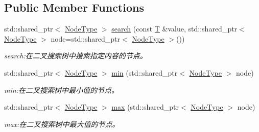\subsection*{Public Member Functions}
\begin{DoxyCompactItemize}
\item 
std\+::shared\+\_\+ptr$<$ \hyperlink{struct_introduction_to_algorithm_1_1_tree_algorithm_1_1_binary_tree_a9a441f3f41c5b69758204ba60fe02010}{Node\+Type} $>$ \hyperlink{class_introduction_to_algorithm_1_1_tree_algorithm_1_1_search_tree_affaf44d28dc2180f93669cb8d6c09c84}{search} (const \hyperlink{class_introduction_to_algorithm_1_1_tree_algorithm_1_1_search_tree_a0a9b2de6326042f2a1fa8a3a0def67ab}{T} \&value, std\+::shared\+\_\+ptr$<$ \hyperlink{struct_introduction_to_algorithm_1_1_tree_algorithm_1_1_binary_tree_a9a441f3f41c5b69758204ba60fe02010}{Node\+Type} $>$ node=std\+::shared\+\_\+ptr$<$ \hyperlink{struct_introduction_to_algorithm_1_1_tree_algorithm_1_1_binary_tree_a9a441f3f41c5b69758204ba60fe02010}{Node\+Type} $>$())
\begin{DoxyCompactList}\small\item\em search\+:在二叉搜索树中搜索指定内容的节点。 \end{DoxyCompactList}\item 
std\+::shared\+\_\+ptr$<$ \hyperlink{struct_introduction_to_algorithm_1_1_tree_algorithm_1_1_binary_tree_a9a441f3f41c5b69758204ba60fe02010}{Node\+Type} $>$ \hyperlink{class_introduction_to_algorithm_1_1_tree_algorithm_1_1_search_tree_af0bb418896808f72bb1edee55d238d55}{min} (std\+::shared\+\_\+ptr$<$ \hyperlink{struct_introduction_to_algorithm_1_1_tree_algorithm_1_1_binary_tree_a9a441f3f41c5b69758204ba60fe02010}{Node\+Type} $>$ node)
\begin{DoxyCompactList}\small\item\em min\+:在二叉搜索树中最小值的节点。 \end{DoxyCompactList}\item 
std\+::shared\+\_\+ptr$<$ \hyperlink{struct_introduction_to_algorithm_1_1_tree_algorithm_1_1_binary_tree_a9a441f3f41c5b69758204ba60fe02010}{Node\+Type} $>$ \hyperlink{class_introduction_to_algorithm_1_1_tree_algorithm_1_1_search_tree_a2dfe32f3914b03ccdb22f88f24a6afdd}{max} (std\+::shared\+\_\+ptr$<$ \hyperlink{struct_introduction_to_algorithm_1_1_tree_algorithm_1_1_binary_tree_a9a441f3f41c5b69758204ba60fe02010}{Node\+Type} $>$ node)
\begin{DoxyCompactList}\small\item\em max\+:在二叉搜索树中最大值的节点。 \end{DoxyCompactList}\item 

\end{DoxyCompactItemize}
